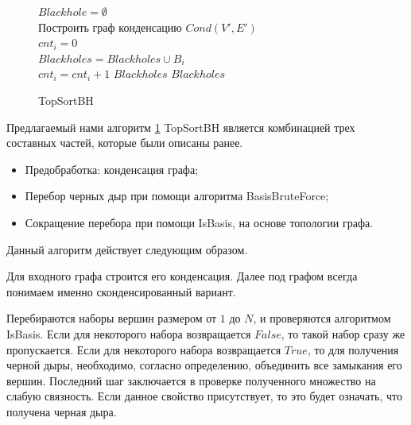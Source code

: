 \documentclass[12pt,a4paper,oneside,openany]{article}
\theoremstyle{definition}
\theoremstyle{lemma}
\theoremstyle{remark}
\begin{document}
\linespread{1.0}
\begin{figure}[H]
	\begin{center}
		\begin{algorithm}[H]
			\SetAlgoLined

                        $Blackhole = \emptyset$\\
                        Построить граф конденсацию $Cond(V',E')$ \\
                         {
                            $cnt_i = 0$ \\
                             {
                                 {
                                     {
                                        $Blackholes = Blackholes \cup B_i$ \\
                                        $cnt_i = cnt_i + 1$
                                    }
                                }
                            }
                             {
                                \Return $Blackholes$
                            }
                        }
                        \Return $Blackholes$
			\label{alg:topsort}
			\caption{TopSortBH}
		\end{algorithm}
	\end{center}
\end{figure}
\linespread{1.5}

Предлагаемый нами алгоритм \ref{alg:topsort} TopSortBH является комбинацией трех составных частей, которые были описаны ранее.
    \begin{itemize}
        \item Предобработка: конденсация графа;
        \item Перебор черных дыр при помощи алгоритма BasisBruteForce;
        \item Сокращение перебора при помощи IsBasis, на основе топологии графа.
    \end{itemize}

Данный алгоритм действует следующим образом.

Для входного графа строится его конденсация.
Далее под графом всегда понимаем именно сконденсированный вариант.

Перебираются наборы вершин размером от $1$ до $N$, и проверяются алгоритмом IsBasis.
Если для некоторого набора возвращается $False$, то такой набор сразу же пропускается.
Если для некоторого набора возвращается $True$, то для получения черной дыры,
необходимо, согласно определению, объединить все замыкания его вершин.
Последний шаг заключается в проверке полученного множество на слабую связность.
Если данное свойство присутствует, то это будет означать, что получена черная дыра.
\end{document}
